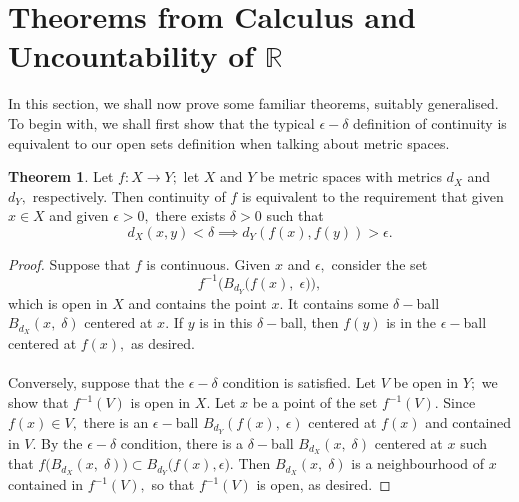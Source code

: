 \documentclass{article}
\theoremstyle{definition}
\newtheorem{theorem}{Theorem}[section]
\begin{document}
\section{Theorems from Calculus and Uncountability of \texorpdfstring{$\mathbb{R}$}{Real Numbers}}
In this section, we shall now prove some familiar theorems, suitably generalised. \\
To begin with, we shall first show that the typical $\epsilon-\delta$ definition of continuity is equivalent to our open sets definition when talking about metric spaces.
\begin{theorem} 
  Let $f:X\longrightarrow Y;$ let $X$ and $Y$ be metric spaces with metrics $d_X$ and $d_Y,$ respectively. Then continuity of $f$ is equivalent to the requirement that given $x\in X$ and given $\epsilon > 0,$ there exists $\delta > 0$ such that
  \[d_X(x, y) < \delta \implies d_Y(f(x), f(y)) > \epsilon .\]
\end{theorem}
\begin{proof}
  Suppose that $f$ is continuous. Given $x$ and $\epsilon,$ consider the set
  \[f^{-1}\Big(B_{d_Y}\big(f(x),\; \epsilon\big)\Big),\]
  which is open in $X$ and contains the point $x.$ It contains some $\delta-$ball $B_{d_X}(x,\;\delta)$ centered at $x.$ If $y$ is in this $\delta-$ball, then $f(y)$ is in the $\epsilon-$ball centered at $f(x),$ as desired.\\\\
  Conversely, suppose that the $\epsilon-\delta$ condition is satisfied. Let $V$ be open in $Y;$ we show that $f^{-1}(V)$ is open in $X.$ Let $x$ be a point of the set $f^{-1}(V).$ Since $f(x) \in V,$ there is an $\epsilon-$ball $B_{d_Y}(f(x),\; \epsilon)$ centered at $f(x)$ and contained in $V.$ By the $\epsilon-\delta$ condition, there is a $\delta-$ball $B_{d_X}(x,\; \delta)$ centered at $x$ such that $f\big(B_{d_X}(x,\; \delta)\big) \subset B_{d_Y}\big(f(x), \epsilon\big).$ Then $B_{d_X}(x,\; \delta)$ is a neighbourhood of $x$ contained in $f^{-1}(V),$ so that $f^{-1}(V)$ is open, as desired.
\end{proof}

\hrulefill
\end{document}

